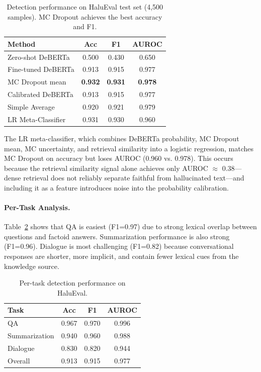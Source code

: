 \documentclass[11pt]{article}
\begin{document}
\begin{table}[h]
\centering
\small
\begin{tabular}{@{}lccc@{}}
\toprule
\textbf{Method} & \textbf{Acc} & \textbf{F1} & \textbf{AUROC} \\
\midrule
Zero-shot DeBERTa & 0.500 & 0.430 & 0.650 \\
Fine-tuned DeBERTa & 0.913 & 0.915 & 0.977 \\
MC Dropout mean & \textbf{0.932} & \textbf{0.931} & \textbf{0.978} \\
Calibrated DeBERTa & 0.913 & 0.915 & 0.977 \\
Simple Average & 0.920 & 0.921 & 0.979 \\
LR Meta-Classifier & 0.931 & 0.930 & 0.960 \\
\bottomrule
\end{tabular}
\caption{Detection performance on HaluEval test set (4,500 samples). MC Dropout achieves the best accuracy and F1.}
\label{tab:main_results}
\end{table}

The LR meta-classifier, which combines DeBERTa probability, MC Dropout mean, MC uncertainty, and retrieval similarity into a logistic regression, matches MC Dropout on accuracy but loses AUROC (0.960 vs. 0.978). This occurs because the retrieval similarity signal alone achieves only AUROC $\approx$ 0.38---dense retrieval does not reliably separate faithful from hallucinated text---and including it as a feature introduces noise into the probability calibration.

\paragraph{Per-Task Analysis.} Table~\ref{tab:per_task} shows that QA is easiest (F1=0.97) due to strong lexical overlap between questions and factoid answers. Summarization performance is also strong (F1=0.96). Dialogue is most challenging (F1=0.82) because conversational responses are shorter, more implicit, and contain fewer lexical cues from the knowledge source.

\begin{table}[h]
\centering
\small
\begin{tabular}{@{}lccc@{}}
\toprule
\textbf{Task} & \textbf{Acc} & \textbf{F1} & \textbf{AUROC} \\
\midrule
QA & 0.967 & 0.970 & 0.996 \\
Summarization & 0.940 & 0.960 & 0.988 \\
Dialogue & 0.830 & 0.820 & 0.944 \\
\midrule
Overall & 0.913 & 0.915 & 0.977 \\
\bottomrule
\end{tabular}
\caption{Per-task detection performance on HaluEval.}
\label{tab:per_task}
\end{table}
\end{document}
